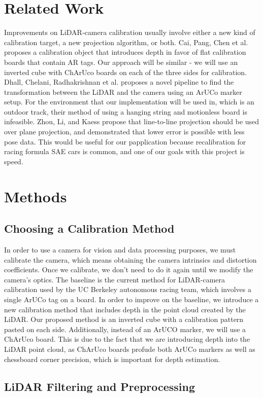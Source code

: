 \documentclass[conference]{IEEEtran}
\begin{document}
\section{Related Work}
Improvements on LiDAR-camera calibration usually involve either a new kind of calibration target, a new projection algorithm, or both. 
Cai, Pang, Chen et al. \cite{Cai} proposes a calibration object that introduces depth in favor of flat calibration boards that contain AR tags. Our approach will be similar - we will use an inverted cube with ChArUco boards on each of the three sides for calibration. Dhall, Chelani, Radhakrishnan et al. \cite{Dhall} proposes a novel pipeline to find the transformation between the LiDAR and the camera using an ArUCo marker setup. For the environment that our implementation will be used in, which is an outdoor track, their method of using a hanging string and motionless board is infeasible. Zhou, Li, and Kaess \cite{Zhou} propose that line-to-line projection should be used over plane projection, and demonstrated that lower error is possible with less pose data. This would be useful for our papplication because recalibration for racing formula SAE cars is common, and one of our goals with this project is speed.

\section{Methods}
\subsection{Choosing a Calibration Method}
In order to use a camera for vision and data processing purposes, we must calibrate the camera, which means obtaining the camera intrinsics and distortion coefficients. Once we calibrate, we don't need to do it again until we modify the camera's optics. The baseline is the current method for LiDAR-camera calibration used by the UC Berkeley autonomous racing team, which involves a single ArUCo tag on a board. In order to improve on the baseline, we introduce a new calibration method that includes depth in the point cloud created by the LiDAR. Our proposed method is an inverted cube with a calibration pattern pasted on each side. Additionally, instead of an ArUCO marker, we will use a ChArUco board. This is due to the fact that we are introducing depth into the LiDAR point cloud, as ChArUco boards profude both ArUCo markers as well as chessboard corner precision, which is important for depth estimation.
\subsection{LiDAR Filtering and Preprocessing}
\end{document}
